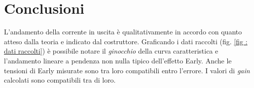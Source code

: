 \section{Conclusioni}\label{sec:conclusioni}
L'andamento della corrente in uscita è qualitativamente in accordo con quanto atteso dalla teoria e indicato dal costruttore.
Graficando i dati raccolti (fig. \ref{fig : dati raccolti}) è possibile notare il \emph{ginocchio} della curva caratteristica
e l'andamento lineare a pendenza non nulla tipico dell'effetto Early.
Anche le tensioni di Early misurate sono tra loro compatibili entro l'errore.
I valori di \emph{gain} calcolati sono compatibili tra di loro.
\vspace{.5cm}
